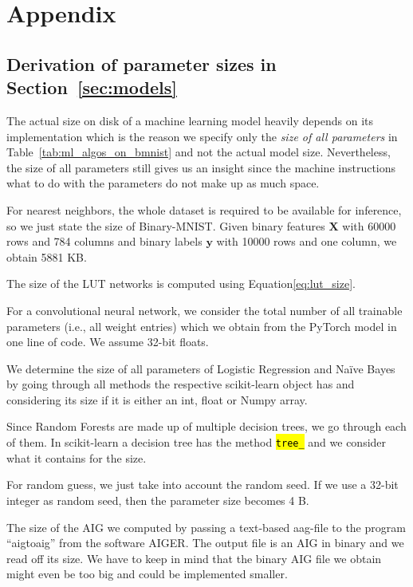 \appendix

\section{Appendix}

\subsection{Derivation of parameter sizes in Section~\ref{sec:models}} \label{app:size}
The actual size on disk of a machine learning model heavily depends on its implementation which is the reason we specify only the \textit{size of all parameters} in Table~\ref{tab:ml_algos_on_bmnist} and not the actual model size. Nevertheless, the size of all parameters still gives us an insight since the machine instructions what to do with the parameters do not make up as much space.

For nearest neighbors, the whole dataset is required to be available for inference, so we just state the size of Binary-MNIST. Given binary features $\bm{X}$ with 60000 rows and 784 columns and binary labels $\bm{y}$ with 10000 rows and one column, we obtain 5881 KB.

The size of the LUT networks is computed using Equation\ref{eq:lut_size}.

For a convolutional neural network, we consider the total number of all trainable parameters (i.e., all weight entries) which we obtain from the PyTorch model in one line of code. We assume 32-bit floats.

We determine the size of all parameters of Logistic Regression and Naïve Bayes by going through all methods the respective scikit-learn object has and considering its size if it is either an int, float or Numpy array.

Since Random Forests are made up of multiple decision trees, we go through each of them. In scikit-learn a decision tree has the method \hl{\texttt{tree\_}} and we consider what it contains for the size.

For random guess, we just take into account the random seed. If we use a 32-bit integer as random seed, then the parameter size becomes 4 B.

The size of the AIG we computed by passing a text-based aag-file to the program \enquote{aigtoaig} from the software AIGER. The output file is an AIG in binary and we read off its size. We have to keep in mind that the binary AIG file we obtain might even be too big and could be implemented smaller.

